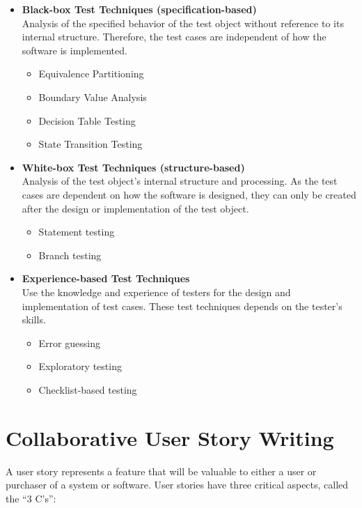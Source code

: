\documentclass{article}
\begin{document}
\begin{multicols}{3}
{\begin{itemize}
\item \textbf{Black-box Test Techniques (specification-based)}\\
Analysis of the specified behavior of the test object without reference to its internal structure. Therefore, the test cases are independent of how the software is implemented.

\begin{itemize}
    \item Equivalence Partitioning
    \item Boundary Value Analysis
    \item Decision Table Testing
    \item State Transition Testing
\end{itemize}

\item \textbf{White-box Test Techniques (structure-based)}\\
Analysis of the test object’s internal structure and processing. As the test cases are dependent on how the software is designed, they can only be created after the design or implementation of the test object.

\begin{itemize}
    \item Statement testing
    \item Branch testing
\end{itemize}

\item \textbf{Experience-based Test Techniques}\\
Use the knowledge and experience of testers for the design and implementation of test cases. These test techniques depends on the tester’s skills.

\begin{itemize}
    \item Error guessing
    \item Exploratory testing
    \item Checklist-based testing
\end{itemize}

\end{itemize}

\section*{Collaborative User Story Writing}
A user story represents a feature that will be valuable to either a user or purchaser of a system or software. User stories have three critical aspects, called the “3 C’s”:

}
\end{multicols}
\end{document}
